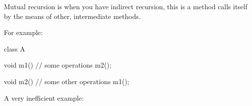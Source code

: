 \documentclass[a4paper, 9pt]{extarticle}
\begin{document}
Mutual recursion is when you have indirect recursion, this is a method calls itself by the means of other, intermediate methods.

For example:

\begin{blackboard}
class A {
  void m1() {
    // some operations
    m2();
  }

  void m2() {
    // some other operations
    m1();
  }
}
\end{blackboard}

A very inefficient example:

\end{document}
